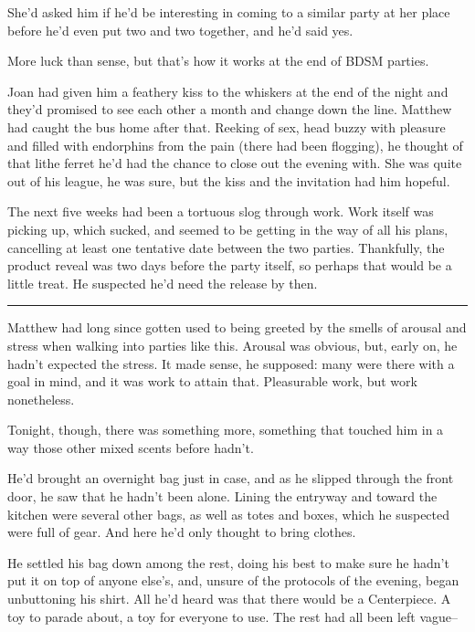 She'd asked him if he'd be interesting in coming to a similar party at
her place before he'd even put two and two together, and he'd said yes.

More luck than sense, but that's how it works at the end of BDSM
parties.

Joan had given him a feathery kiss to the whiskers at the end of the
night and they'd promised to see each other a month and change down the
line. Matthew had caught the bus home after that. Reeking of sex, head
buzzy with pleasure and filled with endorphins from the pain (there had
been flogging), he thought of that lithe ferret he'd had the chance to
close out the evening with. She was quite out of his league, he was
sure, but the kiss and the invitation had him hopeful.

The next five weeks had been a tortuous slog through work. Work itself
was picking up, which sucked, and seemed to be getting in the way of all
his plans, cancelling at least one tentative date between the two
parties. Thankfully, the product reveal was two days before the party
itself, so perhaps that would be a little treat. He suspected he'd need
the release by then.

\begin{center}\rule{0.5\linewidth}{\linethickness}\end{center}

Matthew had long since gotten used to being greeted by the smells of
arousal and stress when walking into parties like this. Arousal was
obvious, but, early on, he hadn't expected the stress. It made sense, he
supposed: many were there with a goal in mind, and it was work to attain
that. Pleasurable work, but work nonetheless.

Tonight, though, there was something more, something that touched him in
a way those other mixed scents before hadn't.

He'd brought an overnight bag just in case, and as he slipped through
the front door, he saw that he hadn't been alone. Lining the entryway
and toward the kitchen were several other bags, as well as totes and
boxes, which he suspected were full of gear. And here he'd only thought
to bring clothes.

He settled his bag down among the rest, doing his best to make sure he
hadn't put it on top of anyone else's, and, unsure of the protocols of
the evening, began unbuttoning his shirt. All he'd heard was that there
would be a Centerpiece. A toy to parade about, a toy for everyone to
use. The rest had all been left vague--

